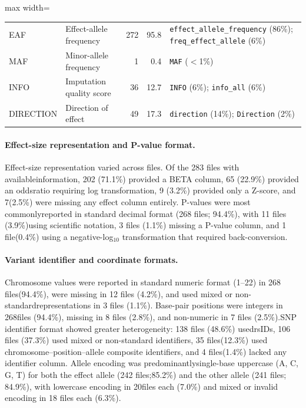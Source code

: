 \documentclass[11pt,a4paper]{article}
\begin{document}
\begin{table}[H]
\begin{adjustbox}{max width=\textwidth}
\begin{tabular}{llrrl}
EAF   & Effect-allele frequency   & 272 & 95.8 & \texttt{effect\_allele\_frequency} (86\%); \texttt{freq\_effect\_allele} (6\%) \\
MAF   & Minor-allele frequency    &   1 &  0.4 & \texttt{MAF} ($<$1\%) \\
INFO  & Imputation quality score  &  36 & 12.7 & \texttt{INFO} (6\%); \texttt{info\_all} (6\%) \\
DIRECTION & Direction of effect   &  49 & 17.3 & \texttt{direction} (14\%); \texttt{Direction} (2\%) \\
\bottomrule
\end{tabular}
\end{adjustbox}
\end{table}

\paragraph{Effect-size representation and P-value format.}Effect-size representation varied across files. Of the 283 files with availableinformation, 202 (71.1\%) provided a BETA column, 65 (22.9\%) provided an oddsratio requiring log transformation, 9 (3.2\%) provided only a Z-score, and 7(2.5\%) were missing any effect column entirely. P-values were most commonlyreported in standard decimal format (268 files; 94.4\%), with 11 files (3.9\%)using scientific notation, 3 files (1.1\%) missing a P-value column, and 1 file(0.4\%) using a negative-log$_{10}$ transformation that required back-conversion.

\paragraph{Variant identifier and coordinate formats.}Chromosome values were reported in standard numeric format (1--22) in 268 files(94.4\%), were missing in 12 files (4.2\%), and used mixed or non-standardrepresentations in 3 files (1.1\%). Base-pair positions were integers in 268files (94.4\%), missing in 8 files (2.8\%), and non-numeric in 7 files (2.5\%).SNP identifier format showed greater heterogeneity: 138 files (48.6\%) usedrsIDs, 106 files (37.3\%) used mixed or non-standard identifiers, 35 files(12.3\%) used chromosome--position--allele composite identifiers, and 4 files(1.4\%) lacked any identifier column. Allele encoding was predominantlysingle-base uppercase (A, C, G, T) for both the effect allele (242 files;85.2\%) and the other allele (241 files; 84.9\%), with lowercase encoding in 20files each (7.0\%) and mixed or invalid encoding in 18 files each (6.3\%).
\end{document}
